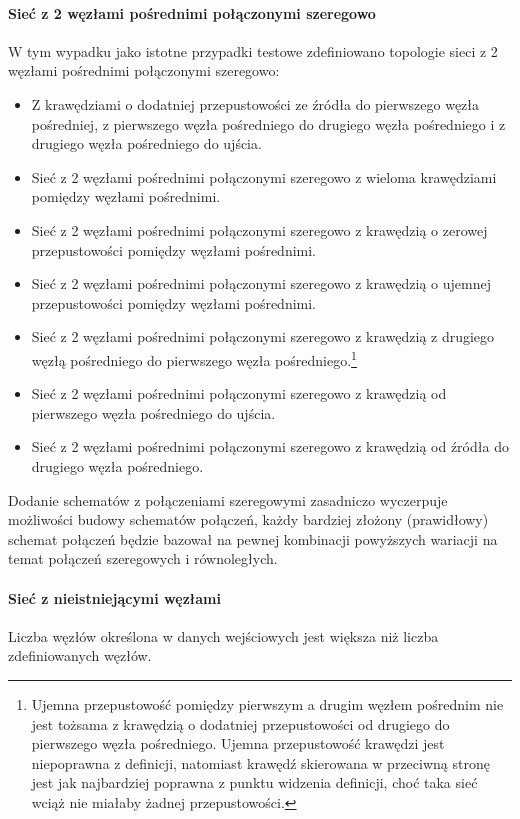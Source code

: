 \begin{itemize}[nosep]
\begin{itemize}[nosep]
\begin{itemize}[nosep]
\paragraph{Sieć z 2 węzłami pośrednimi połączonymi szeregowo}
W tym wypadku jako istotne przypadki testowe zdefiniowano topologie
sieci z 2 węzłami pośrednimi połączonymi szeregowo:
\begin{itemize}[nosep]
    \item Z krawędziami o dodatniej przepustowości ze źródła do pierwszego węzła
    pośredniej, z pierwszego węzła pośredniego do drugiego węzła pośredniego i z
    drugiego węzła pośredniego do ujścia.
    \item Sieć z 2 węzłami pośrednimi połączonymi szeregowo z wieloma
    krawędziami pomiędzy węzłami pośrednimi.
    \item Sieć z 2 węzłami pośrednimi połączonymi szeregowo z krawędzią o
    zerowej przepustowości pomiędzy węzłami pośrednimi.
    \item Sieć z 2 węzłami pośrednimi połączonymi szeregowo z krawędzią o
    ujemnej przepustowości pomiędzy węzłami pośrednimi.
    \item Sieć z 2 węzłami pośrednimi połączonymi szeregowo z krawędzią z
    drugiego węzłą pośredniego do pierwszego węzła pośredniego.\footnote{Ujemna
    przepustowość pomiędzy pierwszym a drugim węzłem pośrednim nie jest tożsama
    z krawędzią o dodatniej przepustowości od drugiego do pierwszego węzła
    pośredniego. Ujemna przepustowość krawędzi jest niepoprawna z definicji,
    natomiast krawędź skierowana w przeciwną stronę jest jak najbardziej
    poprawna z punktu widzenia definicji, choć taka sieć wciąż nie miałaby
    żadnej przepustowości.}
    \item Sieć z 2 węzłami pośrednimi połączonymi szeregowo z krawędzią od
    pierwszego węzła pośredniego do ujścia.
    \item Sieć z 2 węzłami pośrednimi połączonymi szeregowo z krawędzią od
    źródła do drugiego węzła pośredniego.
\end{itemize}
Dodanie schematów z połączeniami szeregowymi zasadniczo wyczerpuje możliwości
budowy schematów połączeń, każdy bardziej złożony (prawidłowy) schemat połączeń
będzie bazował na pewnej kombinacji powyższych wariacji na temat połączeń
szeregowych i równoległych.

\paragraph{Sieć z nieistniejącymi węzłami}
Liczba węzłów określona w danych wejściowych jest większa niż liczba
zdefiniowanych węzłów.


\end{itemize}
\end{itemize}
\end{itemize}
